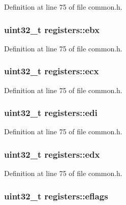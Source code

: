 Definition at line 75 of file common.\+h.

\subsubsection[{\texorpdfstring{ebx}{ebx}}]{\setlength{\rightskip}{0pt plus 5cm}uint32\+\_\+t registers\+::ebx}\hypertarget{structregisters_aa8989b2fef42dca1d656f724eb324f51}{}\label{structregisters_aa8989b2fef42dca1d656f724eb324f51}


Definition at line 75 of file common.\+h.

\subsubsection[{\texorpdfstring{ecx}{ecx}}]{\setlength{\rightskip}{0pt plus 5cm}uint32\+\_\+t registers\+::ecx}\hypertarget{structregisters_a00ce491148fd90800c18bd2d4c22e090}{}\label{structregisters_a00ce491148fd90800c18bd2d4c22e090}


Definition at line 75 of file common.\+h.

\subsubsection[{\texorpdfstring{edi}{edi}}]{\setlength{\rightskip}{0pt plus 5cm}uint32\+\_\+t registers\+::edi}\hypertarget{structregisters_aeedcb447fe6640d43d09c27b7cb8db3b}{}\label{structregisters_aeedcb447fe6640d43d09c27b7cb8db3b}


Definition at line 75 of file common.\+h.

\subsubsection[{\texorpdfstring{edx}{edx}}]{\setlength{\rightskip}{0pt plus 5cm}uint32\+\_\+t registers\+::edx}\hypertarget{structregisters_af3b40afa73ecdaf2c9279b9ed482d26b}{}\label{structregisters_af3b40afa73ecdaf2c9279b9ed482d26b}


Definition at line 75 of file common.\+h.

\subsubsection[{\texorpdfstring{eflags}{eflags}}]{\setlength{\rightskip}{0pt plus 5cm}uint32\+\_\+t registers\+::eflags}\hypertarget{structregisters_af9a17981c1cdac71d6f82ba32466a036}{}\label{structregisters_af9a17981c1cdac71d6f82ba32466a036}


